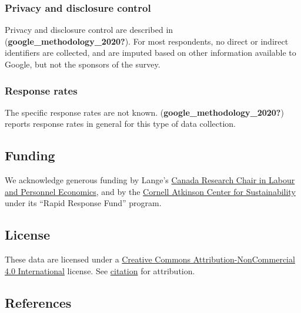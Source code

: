 \documentclass[
]{article}
\begin{document}
\hypertarget{privacy-and-disclosure-control}{%
\subsubsection{Privacy and disclosure
control}\label{privacy-and-disclosure-control}}

Privacy and disclosure control are described in
(\textbf{google\_methodology\_2020?}). For most respondents, no direct
or indirect identifiers are collected, and are imputed based on other
information available to Google, but not the sponsors of the survey.

\hypertarget{response-rates}{%
\subsubsection{Response rates}\label{response-rates}}

The specific response rates are not known.
(\textbf{google\_methodology\_2020?}) reports response rates in general
for this type of data collection.

\hypertarget{funding}{%
\subsection{Funding}\label{funding}}

We acknowledge generous funding by Lange's
\href{https://www.chairs-chaires.gc.ca/chairholders-titulaires/profile-eng.aspx?profileId=3277}{Canada
Research Chair in Labour and Personnel Economics}, and by the
\href{https://www.atkinson.cornell.edu/}{Cornell Atkinson Center for
Sustainability} under its ``Rapid Response Fund'' program.

\hypertarget{license}{%
\subsection{License}\label{license}}

These data are licensed under a
\href{https://creativecommons.org/licenses/by-nc/4.0/}{Creative Commons
Attribution-NonCommercial 4.0 International} license. See
\protect\hyperlink{citation}{citation} for attribution.

\hypertarget{references}{%
\subsection{References}\label{references}}
\end{document}
